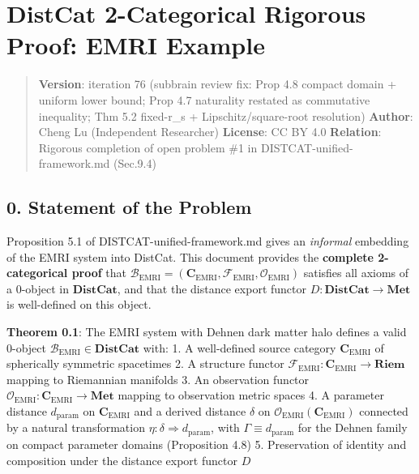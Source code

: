 \documentclass[
]{article}
\author{}
\date{}
\begin{document}
\section{DistCat 2-Categorical Rigorous Proof: EMRI
Example}\label{distcat-2-categorical-rigorous-proof-emri-example}

\begin{quote}
\textbf{Version}: iteration 76 (subbrain review fix: Prop 4.8 compact
domain + uniform lower bound; Prop 4.7 naturality restated as
commutative inequality; Thm 5.2 fixed-r\_s + Lipschitz/square-root
resolution) \textbf{Author}: Cheng Lu (Independent Researcher)
\textbf{License}: CC BY 4.0 \textbf{Relation}: Rigorous completion of
open problem \#1 in DISTCAT-unified-framework.md (Sec.9.4)
\end{quote}

\subsection{0. Statement of the Problem}\label{statement-of-the-problem}

Proposition 5.1 of DISTCAT-unified-framework.md gives an \emph{informal}
embedding of the EMRI system into DistCat. This document provides the
\textbf{complete 2-categorical proof} that
\(\mathcal{B}_{\text{EMRI}} = (\mathbf{C}_{\text{EMRI}}, \mathcal{F}_{\text{EMRI}}, \mathcal{O}_{\text{EMRI}})\)
satisfies all axioms of a 0-object in \(\mathbf{DistCat}\), and that the
distance export functor \(D: \mathbf{DistCat} \to \mathbf{Met}\) is
well-defined on this object.

\textbf{Theorem 0.1}: The EMRI system with Dehnen dark matter halo
defines a valid 0-object
\(\mathcal{B}_{\text{EMRI}} \in \mathbf{DistCat}\) with: 1. A
well-defined source category \(\mathbf{C}_{\text{EMRI}}\) of spherically
symmetric spacetimes 2. A structure functor
\(\mathcal{F}_{\text{EMRI}}: \mathbf{C}_{\text{EMRI}} \to \mathbf{Riem}\)
mapping to Riemannian manifolds 3. An observation functor
\(\mathcal{O}_{\text{EMRI}}: \mathbf{C}_{\text{EMRI}} \to \mathbf{Met}\)
mapping to observation metric spaces 4. A parameter distance
\(d_{\text{param}}\) on \(\mathbf{C}_{\text{EMRI}}\) and a derived
distance \(\delta\) on
\(\mathcal{O}_{\text{EMRI}}(\mathbf{C}_{\text{EMRI}})\) connected by a
natural transformation \(\eta: \delta \Rightarrow d_{\text{param}}\),
with \(\Gamma \equiv d_{\text{param}}\) for the Dehnen family on compact
parameter domains (Proposition 4.8) 5. Preservation of identity and
composition under the distance export functor \(D\)
\end{document}
